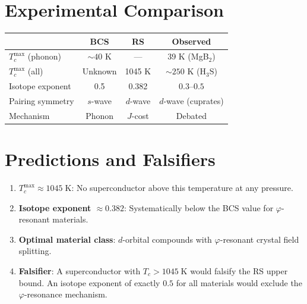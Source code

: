 \documentclass[12pt,a4paper]{article}
\theoremstyle{definition}
\theoremstyle{remark}
\begin{document}
\section{Experimental Comparison}
\label{sec:comparison}

\begin{center}
\renewcommand{\arraystretch}{1.3}
\begin{tabular}{@{}lccc@{}}
\toprule
& \textbf{BCS} & \textbf{RS} & \textbf{Observed} \\
\midrule
$T_c^{\max}$ (phonon) & $\sim 40$ K & --- & 39 K (MgB$_2$) \\
$T_c^{\max}$ (all) & Unknown & 1045 K & $\sim 250$ K
(H$_3$S) \\
Isotope exponent & 0.5 & 0.382 & $0.3$--$0.5$ \\
Pairing symmetry & $s$-wave & $d$-wave & $d$-wave (cuprates) \\
Mechanism & Phonon & $J$-cost & Debated \\
\bottomrule
\end{tabular}
\end{center}

\section{Predictions and Falsifiers}
\label{sec:predictions}

\begin{enumerate}
  \item \textbf{$T_c^{\max} \approx 1045\;\mathrm{K}$}: No
  superconductor above this temperature at any pressure.

  \item \textbf{Isotope exponent $\approx 0.382$}: Systematically
  below the BCS value for $\varphi$-resonant materials.

  \item \textbf{Optimal material class}: $d$-orbital compounds
  with $\varphi$-resonant crystal field splitting.

  \item \textbf{Falsifier}: A superconductor with
  $T_c > 1045\;\mathrm{K}$ would falsify the RS upper bound.
  An isotope exponent of exactly $0.5$ for all materials would
  exclude the $\varphi$-resonance mechanism.
\end{enumerate}
\end{document}
